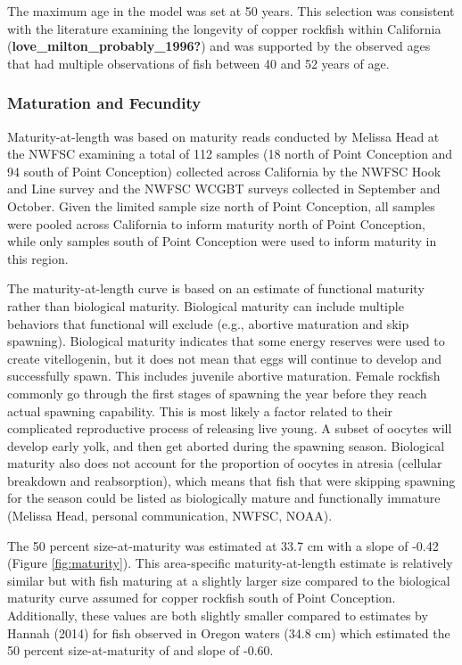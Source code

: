 \documentclass[11pt,
  english,
  letterpaper,
]{article}
\begin{document}
The maximum age in the model was set at 50 years. This selection was consistent with the literature examining the longevity of copper rockfish within California (\textbf{love\_milton\_probably\_1996?}) and was supported by the observed ages that had multiple observations of fish between 40 and 52 years of age.

\hypertarget{maturation-and-fecundity}{%
\subsubsection{Maturation and Fecundity}\label{maturation-and-fecundity}}

Maturity-at-length was based on maturity reads conducted by Melissa Head at the NWFSC examining a total of 112 samples (18 north of Point Conception and 94 south of Point Conception) collected across California by the NWFSC Hook and Line survey and the NWFSC WCGBT surveys collected in September and October. Given the limited sample size north of Point Conception, all samples were pooled across California to inform maturity north of Point Conception, while only samples south of Point Conception were used to inform maturity in this region.

The maturity-at-length curve is based on an estimate of functional maturity rather than biological maturity. Biological maturity can include multiple behaviors that functional will exclude (e.g., abortive maturation and skip spawning). Biological maturity indicates that some energy reserves were used to create vitellogenin, but it does not mean that eggs will continue to develop and successfully spawn. This includes juvenile abortive maturation. Female rockfish commonly go through the first stages of spawning the year before they reach actual spawning capability. This is most likely a factor related to their complicated reproductive process of releasing live young. A subset of oocytes will develop early yolk, and then get aborted during the spawning season. Biological maturity also does not account for the proportion of oocytes in atresia (cellular breakdown and reabsorption), which means that fish that were skipping spawning for the season could be listed as biologically mature and functionally immature (Melissa Head, personal communication, NWFSC, NOAA).

The 50 percent size-at-maturity was estimated at 33.7 cm with a slope of -0.42 (Figure \ref{fig:maturity}). This area-specific maturity-at-length estimate is relatively similar but with fish maturing at a slightly larger size compared to the biological maturity curve assumed for copper rockfish south of Point Conception. Additionally, these values are both slightly smaller compared to estimates by Hannah (2014) for fish observed in Oregon waters (34.8 cm) which estimated the 50 percent size-at-maturity of and slope of -0.60.
\end{document}
